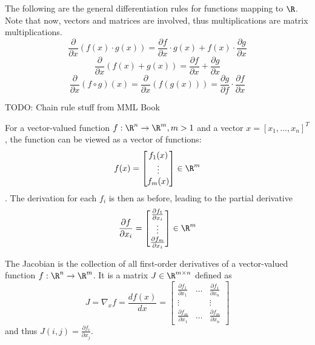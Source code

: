 The following are the general differentiation rules for functions mapping to $\R$.
Note that now, vectors and matrices are involved, thus multiplications are matrix multiplications.
\begin{equation*}
    \frac{\partial}{\partial x} (f(x) \cdot g(x)) 
    = \frac{\partial f}{\partial x} \cdot g(x) + f(x) \cdot \frac{\partial g}{\partial x}
\end{equation*}
\begin{equation*}
    \frac{\partial}{\partial x} (f(x) + g(x)) 
    = \frac{\partial f}{\partial x} + \frac{\partial g}{\partial x}
\end{equation*}
\begin{equation*}
    \frac{\partial}{\partial x} (f \circ g)(x) 
    = \frac{\partial}{\partial x} (f(g(x)))
    = \frac{\partial g}{\partial f} \cdot \frac{\partial f}{\partial x}
\end{equation*}

TODO: Chain rule stuff from MML Book

For a vector-valued function $f : \R^n \to \R^m, m > 1$
and a vector $x = [x_1, \dotsc, x_n]^T$,
the function can be viewed as a vector of functions:
\begin{equation*}
    f(x) = 
    \begin{bmatrix}
    f_1(x) \\
    \vdots \\
    f_m(x)
    \end{bmatrix}
    \in \R^m
\end{equation*}.
The derivation for each $f_i$ is then as before, leading to the partial derivative
\begin{equation*}
    \frac{\partial f}{\partial x_i} =
    \begin{bmatrix}
    \frac{\partial f_1}{\partial x_i} \\
    \vdots \\
    \frac{\partial f_m}{\partial x_i}
    \end{bmatrix}
    \in \R^m
\end{equation*}

The Jacobian is the collection of all first-order derivatives of a vector-valued function
$f : \R^n \to \R^m$.
It is a matrix $J \in \R^{m \times n}$ defined as
\begin{equation*}
    J = \nabla_x f = \frac{d f(x)}{d x} =
    \begin{bmatrix}
    \frac{\partial f_1}{\partial x_1} & \dots & \frac{\partial f_1}{\partial x_n} \\
    \vdots & & \vdots \\
    \frac{\partial f_m}{\partial x_1} & \dots & \frac{\partial f_m}{\partial x_n}
    \end{bmatrix}
\end{equation*}
and thus $J(i, j) = \frac{\partial f_i}{\partial x_j}$.

